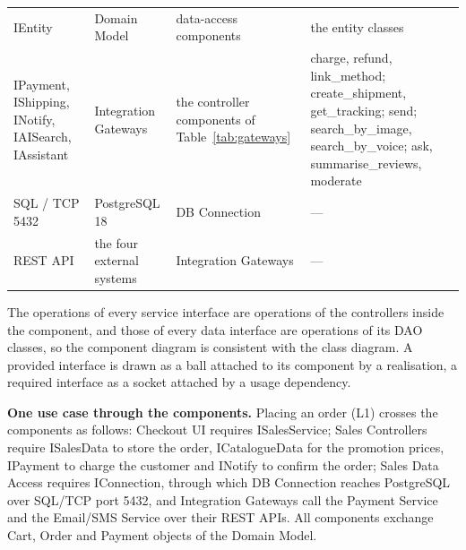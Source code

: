 {\begin{xltabular}{\textwidth}{@{}L{2.9cm} L{2.8cm} L{3.2cm} Y@{}}
\textsf{IEntity} & Domain Model & data-access components & the entity classes \\
\textsf{IPayment}, \textsf{IShipping}, \textsf{INotify}, \textsf{IAISearch}, \textsf{IAssistant} & Integration Gateways & the controller components of Table~\ref{tab:gateways} & charge, refund, link\_method; create\_shipment, get\_tracking; send; search\_by\_image, search\_by\_voice; ask, summarise\_reviews, moderate \\
SQL / TCP 5432 & PostgreSQL 18 & DB Connection & --- \\
REST API & the four external systems & Integration Gateways & --- \\
\end{xltabular}
}

The operations of every service interface are operations of the controllers inside the component, and those of every data interface are operations of its DAO classes, so the component diagram is consistent with the class diagram. A provided interface is drawn as a ball attached to its component by a realisation, a required interface as a socket attached by a usage dependency.

\textbf{One use case through the components.} Placing an order (L1) crosses the components as follows: Checkout UI requires \textsf{ISalesService}; Sales Controllers require \textsf{ISalesData} to store the order, \textsf{ICatalogueData} for the promotion prices, \textsf{IPayment} to charge the customer and \textsf{INotify} to confirm the order; Sales Data Access requires \textsf{IConnection}, through which DB Connection reaches PostgreSQL over SQL/TCP port 5432, and Integration Gateways call the Payment Service and the Email/SMS Service over their REST APIs. All components exchange \textsf{Cart}, \textsf{Order} and \textsf{Payment} objects of the Domain Model.

